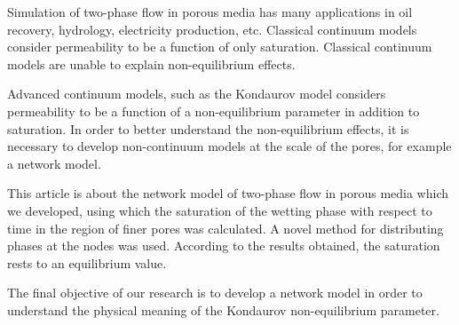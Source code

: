 Simulation of two-phase flow in porous media has many applications in oil recovery, hydrology, electricity production, etc. Classical continuum models consider permeability to be a function of only saturation. Classical continuum models are unable to explain non-equilibrium effects.

Advanced continuum models, such as the Kondaurov model considers permeability to be a function of a non-equilibrium parameter in addition to saturation. In order to better understand the non-equilibrium effects, it is necessary to develop non-continuum models at the scale of the pores, for example a network model.

This article is about the network model of two-phase flow in porous media which we developed, using which the saturation of the wetting phase with respect to time in the region of finer pores was calculated. A novel method for distributing phases at the nodes was used. According to the results obtained, the saturation rests to an equilibrium value. 

The final objective of our research is to develop a network model in order to understand the physical meaning of the Kondaurov non-equilibrium parameter. 

